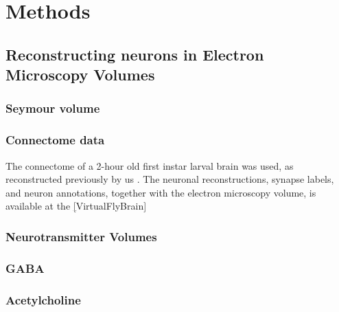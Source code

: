 
\chapter{Methods}


\section{Reconstructing neurons in Electron Microscopy Volumes}
    \subsection{Seymour volume}
    \citep{ohyama2015multilevel}

    
    \subsection{Connectome data}
    The connectome of a 2-hour old first instar larval brain was used, as reconstructed previously by us \citep{winding2023connectome}. The neuronal reconstructions, synapse labels, and neuron annotations, together with the electron microscopy volume, is available at the \href{https://l1em.catmaid.virtualflybrain.org/?pid=1&zp=108250&yp=82961.59999999999&xp=54210.799999999996&tool=tracingtool&sid0=1&s0=2.4999999999999996&help=true&layout=h(XY,%20%7B%20type:%20%22neuron-search%22,%20id:%20%22neuron-search-1%22,%20options:%20%7B%22annotation-name%22:%20%22papers%22%7D%7D,%200.6)}[VirtualFlyBrain]
    \subsection{Neurotransmitter Volumes}
    \subsection*{GABA}
    \subsection*{Acetylcholine}

